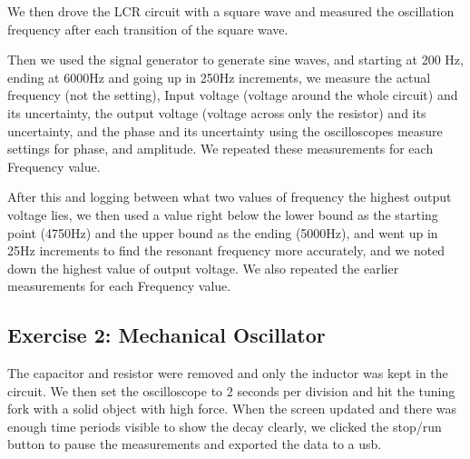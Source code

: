 \documentclass[
	a4paper, %
	10pt, %
	twoside, %
]{journal}
\begin{document}
\begin{table}[h]
    \centering
    \caption{Measured Component Values}
    \label{tab:component_values}
\end{table}

We then drove the LCR circuit with a square wave and measured the oscillation frequency after each transition of the square wave. 

Then we used the signal generator to generate sine waves, and starting at 200 Hz, ending at 6000Hz and going up in 250Hz increments, we measure the actual frequency (not the setting), Input voltage (voltage around the whole circuit) and its uncertainty, the output voltage (voltage across only the resistor) and its uncertainty, and the phase and its uncertainty using the oscilloscopes measure settings for phase, and amplitude. We repeated these measurements for each Frequency value.

After this and logging between what two values of frequency the highest output voltage lies, we then used a value right below the lower bound as the starting point (4750Hz) and the upper bound as the ending (5000Hz), and went up in 25Hz increments to find the resonant frequency more accurately, and we noted down the highest value of output voltage. We also repeated the earlier measurements for each Frequency value.


\subsection{Exercise 2: Mechanical Oscillator}

The capacitor and resistor were removed and only the inductor was kept in the circuit. We then set the oscilloscope to 2 seconds per division and hit the tuning fork with a solid object with high force. When the screen updated and there was enough time periods visible to show the decay clearly, we clicked the stop/run button to pause the measurements and exported the data to a usb. 
\end{document}
